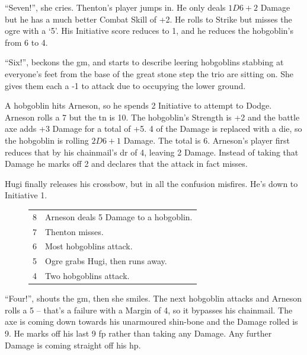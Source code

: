 \begin{multicols}{2}
{\begin{exampletext}
	``Seven!'', she cries. Thenton's player jumps in. He only deals $1D6+2$ Damage but he has a much better Combat Skill of +2. He rolls to Strike but misses the ogre with a `5'. His Initiative score reduces to 1, and he reduces the hobgoblin's from 6 to 4.

	``Six!'', beckons the \gls{gm}, and starts to describe leering hobgoblins stabbing at everyone's feet from the base of the great stone step the trio are sitting on. She gives them each a -1 to attack due to occupying the lower ground.

	A hobgoblin hits Arneson, so he spends 2 Initiative to attempt to Dodge. Arneson rolls a 7 but the \gls{tn} is 10.
	The hobgoblin's Strength is +2 and the battle axe adds +3 Damage for a total of +5.
	4 of the Damage is replaced with a die, so the hobgoblin is rolling $2D6+1$ Damage.
	The total is 6.
	Arneson's player first reduces that by his chainmail's \gls{dr} of 4, leaving 2 Damage.
	Instead of taking that Damage he marks off 2  and declares that the attack in fact misses.

	Hugi finally releases his crossbow, but in all the confusion misfires. He's down to Initiative 1.

		\needspace{3cm}
		\begin{figure}

			\begin{tabularx}{.3\textwidth}{c|X}
				\setcounter{enc}{12}

				8 & Arneson deals 5 Damage to a hobgoblin. \\

				7 & Thenton misses. \\

				6 & Most hobgoblins attack. \\

				5 & Ogre grabs Hugi, then runs away. \\
				4 & Two hobgoblins attack. \\


			\end{tabularx}

		\end{figure}

	``Four!'', shouts the \gls{gm}, then she smiles. The next hobgoblin attacks and Arneson rolls a 5 -- that's a failure with a Margin of 4, so it bypasses his chainmail. The axe is coming down towards his unarmoured shin-bone and the Damage rolled is 9. He marks off his last 9 \gls{fp} rather than taking any Damage. Any further Damage is coming straight off his \gls{hp}.


\end{exampletext}}
\end{multicols}
